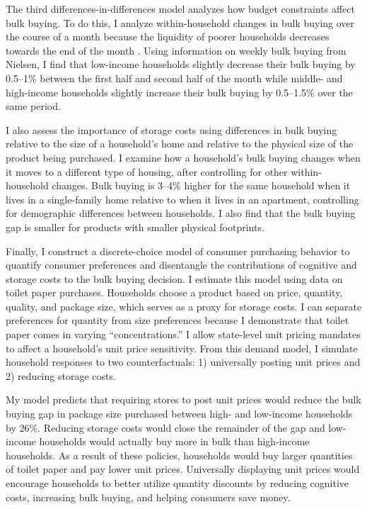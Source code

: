 \documentclass[AER]{AEA_mal}
\begin{document}
The third differences-in-differences model analyzes how budget constraints affect bulk buying. To do this, I analyze within-household changes in bulk buying over the course of a month because the liquidity of poorer households decreases towards the end of the month \citep{orhun2018}. Using information on weekly bulk buying from Nielsen, I find that low-income households slightly decrease their bulk buying by 0.5--1\% between the first half and second half of the month while middle- and high-income households slightly increase their bulk buying by 0.5--1.5\% over the same period.

I also assess the importance of storage costs using differences in bulk buying relative to the size of a household's home and relative to the physical size of the product being purchased. I examine how a household's bulk buying changes when it moves to a different type of housing, after controlling for other within-household changes. Bulk buying is 3--4\% higher for the same household when it lives in a single-family home relative to when it lives in an apartment, controlling for demographic differences between households. I also find that the bulk buying gap is smaller for products with smaller physical footprints.

Finally, I construct a discrete-choice model of consumer purchasing behavior to quantify consumer preferences and disentangle the contributions of cognitive and storage costs to the bulk buying decision. I estimate this model using data on toilet paper purchases. Households choose a product based on price, quantity, quality, and package size, which serves as a proxy for storage costs. I can separate preferences for quantity from size preferences because I demonstrate that toilet paper comes in varying ``concentrations.'' I allow state-level unit pricing mandates to affect a household’s unit price sensitivity. From this demand model, I simulate household responses to two counterfactuals: 1) universally posting unit prices and 2) reducing storage costs.

My model predicts that requiring stores to post unit prices would reduce the bulk buying gap in package size purchased between high- and low-income households by 26\%. Reducing storage costs would close the remainder of the gap and low-income households would actually buy more in bulk than high-income households. As a result of these policies, households would buy larger quantities of toilet paper and pay lower unit prices. Universally displaying unit prices would encourage households to better utilize quantity discounts by reducing cognitive costs, increasing bulk buying, and helping consumers save money.
\end{document}
